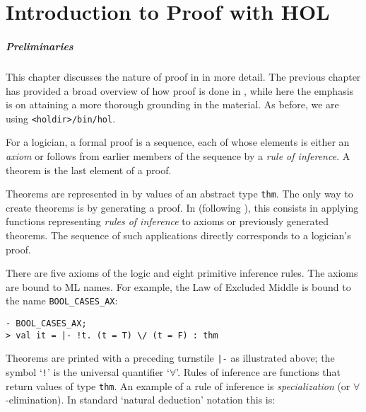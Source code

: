 \chapter{Introduction to Proof with HOL}
\label{proof}

\newcommand\tacticline{\hline \hline}
\newenvironment{proofenumerate}{\begin{enumerate}}{\end{enumerate}}


\paragraph{Preliminaries} This chapter discusses the nature of proof
in \HOL{} in more detail.  The previous chapter has provided a broad
overview of how proof is done in \HOL{}, while here the emphasis is on
attaining a more thorough grounding in the material.  As before, we
are using \texttt{<holdir>/bin/hol}.

\setcounter{sessioncount}{0}

For a logician, a formal proof is a sequence, each of whose elements
is either an {\it axiom\/} or follows from earlier members of the
sequence by a {\it rule of inference\/}.  A theorem is the last
element of a proof.

Theorems are represented in \HOL{} by values of an abstract type
{\small\verb|thm|}.  The  only way  to create theorems is by generating a
proof.  In \HOL{} (following \LCF), this consists in applying \ML{} functions
representing {\it rules of inference\/} to  axioms or previously generated
theorems.  The sequence of such applications  directly corresponds to a
logician's proof.

There are five axioms of the \HOL{} logic and eight primitive
inference rules. The axioms are bound to ML names. For example, the Law of
Excluded Middle is bound to the \ML{} name {\small\verb|BOOL_CASES_AX|}:

\begin{session}
\begin{verbatim}
- BOOL_CASES_AX;
> val it = |- !t. (t = T) \/ (t = F) : thm
\end{verbatim}
\end{session}

Theorems are printed with a preceding turnstile {\small\verb+|-+} as
illustrated above; the symbol `{\small\verb|!|}' is the universal
quantifier `$\forall$'.  Rules of inference are \ML{} functions that
return values of type {\small\verb|thm|}.  An example of a rule of
inference is {\it specialization\/} (or $\forall$-elimination).  In
standard `natural deduction' notation this is:

